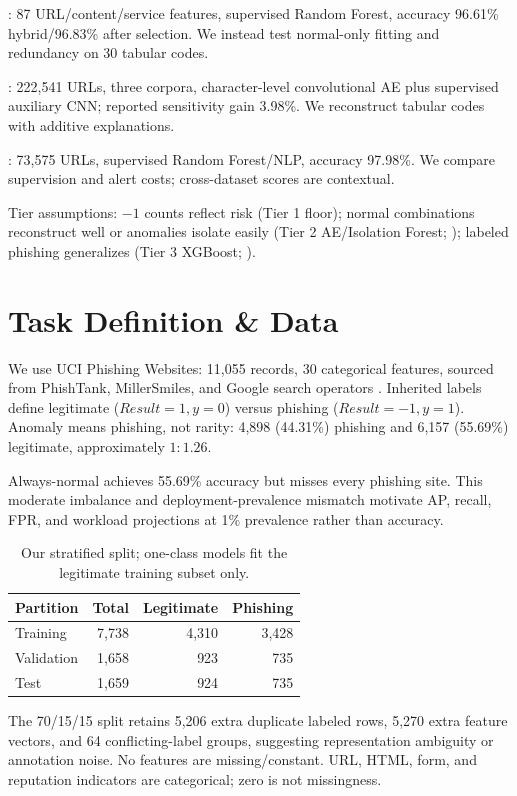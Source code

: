 \documentclass[11pt]{article}
\begin{document}
\citet{hannousse2021}: 87 URL/content/service features, supervised Random Forest, accuracy 96.61\% hybrid/96.83\% after selection. We instead test normal-only fitting and redundancy on 30 tabular codes.

\citet{bu2021}: 222,541 URLs, three corpora, character-level convolutional AE plus supervised auxiliary CNN; reported sensitivity gain 3.98\%. We reconstruct tabular codes with additive explanations.

\citet{sahingoz2019}: 73,575 URLs, supervised Random Forest/NLP, accuracy 97.98\%. We compare supervision and alert costs; cross-dataset scores are contextual.

Tier assumptions: $-1$ counts reflect risk (Tier 1 floor); normal combinations reconstruct well or anomalies isolate easily (Tier 2 AE/Isolation Forest; \citet{liu2008}); labeled phishing generalizes (Tier 3 XGBoost; \citet{chen2016}).
\section{Task Definition \& Data}
We use UCI Phishing Websites: 11,055 records, 30 categorical features, sourced from PhishTank, MillerSmiles, and Google search operators \citep{uci}. Inherited labels define legitimate ($Result=1,y=0$) versus phishing ($Result=-1,y=1$). Anomaly means phishing, not rarity: 4,898 (44.31\%) phishing and 6,157 (55.69\%) legitimate, approximately $1:1.26$.

Always-normal achieves 55.69\% accuracy but misses every phishing site. This moderate imbalance and deployment-prevalence mismatch motivate AP, recall, FPR, and workload projections at 1\% prevalence rather than accuracy.

\begin{table}[t]\centering\small
\begin{tabular}{lrrr}\toprule
Partition & Total & Legitimate & Phishing\\\midrule
Training & 7,738 & 4,310 & 3,428\\
Validation & 1,658 & 923 & 735\\
Test & 1,659 & 924 & 735\\\bottomrule
\end{tabular}
\caption{Our stratified split; one-class models fit the legitimate training subset only.}\label{tab:data}
\end{table}
The 70/15/15 split retains 5,206 extra duplicate labeled rows, 5,270 extra feature vectors, and 64 conflicting-label groups, suggesting representation ambiguity or annotation noise. No features are missing/constant. URL, HTML, form, and reputation indicators are categorical; zero is not missingness.
\end{document}
